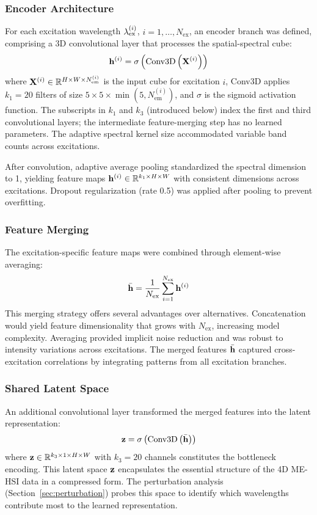 \subsubsection{Encoder Architecture}
For each excitation wavelength $\lambda_{\text{ex}}^{(i)}$, $i = 1, \ldots, N_{\text{ex}}$, an encoder branch was defined, comprising a 3D convolutional layer that processes the spatial-spectral cube:
\begin{equation}
\mathbf{h}^{(i)} = \sigma\left(\text{Conv3D}\left(\mathbf{X}^{(i)}\right)\right)
\label{eq:encoder}
\end{equation}
where $\mathbf{X}^{(i)} \in \mathbb{R}^{H \times W \times N_{\text{em}}^{(i)}}$ is the input cube for excitation $i$, Conv3D applies $k_1 = 20$ filters of size $5 \times 5 \times \min(5, N_{\text{em}}^{(i)})$, and $\sigma$ is the sigmoid activation function.
The subscripts in $k_1$ and $k_3$ (introduced below) index the first and third convolutional layers; the intermediate feature-merging step has no learned parameters.
The adaptive spectral kernel size accommodated variable band counts across excitations.

After convolution, adaptive average pooling standardized the spectral dimension to 1, yielding feature maps $\mathbf{h}^{(i)} \in \mathbb{R}^{k_1 \times H \times W}$ with consistent dimensions across excitations.
Dropout regularization (rate 0.5) was applied after pooling to prevent overfitting.

\subsubsection{Feature Merging}
The excitation-specific feature maps were combined through element-wise averaging:
\begin{equation}
\bar{\mathbf{h}} = \frac{1}{N_{\text{ex}}} \sum_{i=1}^{N_{\text{ex}}} \mathbf{h}^{(i)}
\label{eq:merge}
\end{equation}
This merging strategy offers several advantages over alternatives.
Concatenation would yield feature dimensionality that grows with $N_{\text{ex}}$, increasing model complexity.
Averaging provided implicit noise reduction and was robust to intensity variations across excitations.
The merged features $\bar{\mathbf{h}}$ captured cross-excitation correlations by integrating patterns from all excitation branches.

\subsubsection{Shared Latent Space}
An additional convolutional layer transformed the merged features into the latent representation:
\begin{equation}
\mathbf{z} = \sigma\left(\text{Conv3D}\left(\bar{\mathbf{h}}\right)\right)
\label{eq:latent}
\end{equation}
where $\mathbf{z} \in \mathbb{R}^{k_3 \times 1 \times H \times W}$ with $k_3 = 20$ channels constitutes the bottleneck encoding.
This latent space $\mathbf{z}$ encapsulates the essential structure of the 4D ME-HSI data in a compressed form.
The perturbation analysis (Section~\ref{sec:perturbation}) probes this space to identify which wavelengths contribute most to the learned representation.

